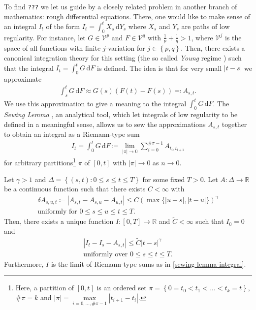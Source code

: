 To find \texttt{???} we let us guide by a closely related problem in another branch of mathematics: rough differential equations. There, one would like to make sense of an integral $I_t$  of the form $I_t = \int^t_0 X_s \, \mathrm{d}Y_s$ where $X_s$ and $Y_s$ are paths of low regularity. For instance, let $G \in \mathcal{V}^p$ and $F \in \mathcal{V}^q$ with $\frac{1}{p} + \frac{1}{q} > 1$, where $\mathcal{V}^j$ is the space of all functions with finite $j$-variation for $j \in \left\{ p,q \right\}$. Then, there exists a canonical integration theory for this setting (the so called \emph{Young} regime \cite{Young1936AnIO}) such that the integral $I_t = \int^t_0 G \, \mathrm{d}F$ is defined. The idea is that for very small $|t-s|$ we approximate 
\begin{align*}
    \int^t_s G \, \mathrm{d}F \approx G(s)(F(t) - F(s)) \eqqcolon A_{s,t}.
\end{align*}
We use this approximation to give a meaning to the integral $\int^t_0 G \, \mathrm{d}F$.
The \emph{Sewing Lemma} \cite{GUBINELLI200486}, an analytical tool, which let integrals of low regularity to be defined in a meaningful sense, allows us to sew the approximations $A_{s,t}$ together to obtain an integral as a Riemann-type sum
\begin{align}\label{sewing-lemma-integral}
    I_t = \int^t_0 G \, \mathrm{d}F \coloneqq \lim\limits_{|\pi| \to 0} \sum\limits_{i=0}^{\# \pi - 1} A_{t_i,t_{i+1}}
\end{align}
for arbitrary partitions\footnote{Here, a partition of $[0,t]$ is an ordered set $\pi = \left\{ 0 = t_0 < t_1 < ... < t_k = t  \right\}$, $\# \pi = k$ and $|\pi| = \max\limits_{i=0,...,\# \pi - 1} |t_{i+1} - t_{i}|$.} $\pi$ of $[0,t]$ with $|\pi| \to 0$ as $n \to 0$.
\begin{lemma}
    Let $\gamma > 1$ and $\Delta = \left\{ (s,t) :  0 \leq s \leq t \leq T\right\}$ for some fixed $T > 0$. Let $A: \Delta \to \mathbb{R}$ be a continuous function such that there exists $C <\infty$ with
    \begin{gather}
        \delta A_{s,u,t} \coloneqq |A_{s,t} - A_{s,u} - A_{u,t}| \leq C (\max\{|u-s|,|t-u|\})^\gamma \label{sewing-lemma-condition}\\
        \text{uniformly for $0 \leq s \leq u \leq t \leq T$}. \nonumber
    \end{gather} 
    Then, there exists a unique function $I: [0,T] \to \mathbb{R}$ and $\tilde C < \infty$  such that $I_0 = 0$ and 
    \begin{gather*}
        |I_t - I_s - A_{s,t}| \leq \tilde C|t-s|^\gamma\\
        \text{uniformly over $0 \leq s \leq t \leq T$.}
    \end{gather*}  
    Furthermore, $I$ is the limit of Riemann-type sums as in \eqref{sewing-lemma-integral}.  
\end{lemma}

